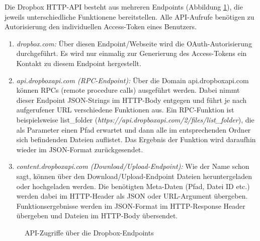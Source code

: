 Die Dropbox HTTP-API besteht aus mehreren Endpoints (Abbildung \ref{04ergebnis:dpendpoints}), die jeweils unterschiedliche Funktionene bereitstellen. Alle API-Aufrufe benötigen zu Autorisierung den individuellen Access-Token eines Benutzers.

\begin{enumerate}
	\item \textit{dropbox.com:} Über diesen Endpoint/Webseite wird die OAuth-Autorisierung durchgeführt. Es wird nur einmalig zur Generierung des Access-Tokens ein Kontakt zu diesem Endpoint hergestellt.
	
	\item \textit{api.dropboxapi.com (RPC-Endpoint):}  Über die Domain api.dropboxapi.com können RPCs (remote procedure calls) ausgeführt werden. Dabei nimmt dieser Endpoint JSON-Strings im HTTP-Body entgegen und führt je nach aufgerufener URL verschiedene Funktionen aus. Ein RPC-Funktion ist beispielsweise list\_{folder} (\textit{https://api.dropboxapi.com/2/files/list\_{folder}}), die als Parameter einen Pfad erwartet und dann alle im entsprechenden Ordner sich
 befindenden Dateien auflistet. Das Ergebnis der Funktion wird daraufhin wieder im JSON-Format zurückgesendet.
 
 	\item \textit{content.dropboxapi.com (Download/Upload-Endpoint):} Wie der Name schon sagt, können über den Download/Upload-Endpoint Dateien heruntergeladen oder hochgeladen werden. Die benötigten Meta-Daten (Pfad, Datei ID etc.) werden dabei im HTTP-Header als JSON oder URL-Argument übergeben. Funktionsergebnisse werden im JSON-Format im HTTP-Response Header übergeben und Dateien im HTTP-Body übersendet.
\end{enumerate}

\begin{figure}[H]
\centering
	\scalebox{0.5}{}
	\caption{API-Zugriffe über die Dropbox-Endpoints}
	\label{04ergebnis:dpendpoints}	
\end{figure}

